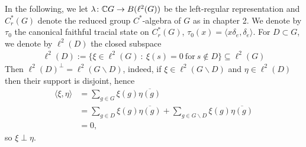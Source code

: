 In the following, we let $\lambda \colon \mathbb{C} G \to B(\ell^2(G))$ be the left-regular representation and $C^*_r(G)$ denote the reduced group $C^*$-algebra of $G$ as in chapter 2. We denote by $\tau_0$ the canonical faithful tracial state on $C^*_r(G)$, $\tau_0(x)=\langle x \delta_e,\delta_e\rangle$. For $D \subset G$, we denote by $\ell^2(D)$ the closed subspace
\begin{align*}
\ell^2(D):=\{ \xi \in \ell^2(G)\ \colon\ \xi(s) = 0 \ \text{for} \ s \not\in D\} \subseteq \ell^2(G)
\end{align*}
Then $\ell^2(D)^{\perp} = \ell^2(G \backslash D)$, indeed, if $\xi \in \ell^2(G\backslash D)$ and $\eta \in \ell^2 (D)$ then their support is disjoint, hence
\begin{align*}
\langle \xi, \eta \rangle&=\sum_{g \in G} \xi(g) \overline{\eta(g)}\\
&=\sum_{g \in D} \xi(g) \overline{\eta(g)} + \sum_{g \in G \backslash D} \xi(g) \overline{\eta(g)}\\
&= 0,
\end{align*}
so $\xi \perp \eta$.
%
%
%
